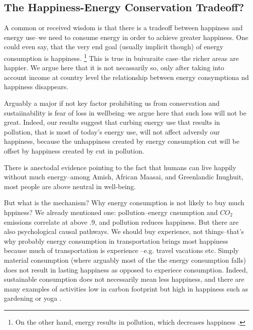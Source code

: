 \documentclass[10pt, letterpaper]{article}
\begin{document}
\begin{spacing}{1.4}
\section{The Happiness-Energy Conservation Tradeoff?}

A common or received wisdom is that there is a tradeoff between happiness and
energy use--we need to consume energy in order to achieve greater
happiness. One could even say, that the very end goal (usually implicit though)
of energy consumption is happiness. \footnote{On the other hand, energy results in pollution, which
  decreases happiness \citep[e.g]{welsch05, weinhold12}.} This is
true in buivaraite case--the richer areas are happier.
 We argue here that it is not necassarily so, only after taking into account
 income at country level %
 the relationship between energy consymptiona nd happiness disappears.


Arguably a major if not key factor prohibiting us from conservation and
sustaiinability is fear of loss in wellbeing--we argue here that such loss will
not be great. Indeed, our results suggest that curbing energy use that results
in pollution, that is most of today's energy use, will not affect adversly our
happiness, because the unhappiness created by energy consumption cut will be
offset by happiness created by cut in pollution.  

There is anectodal evidence pointing to the fact that humans can live happily
without much energy--among Amish, African Maasai, and Greenlandic Inughuit, most
people are above neutral in well-being.

But what is the mechanism? Why energy consumption is not likely to buy much
hppiness? We already mentioned one: pollution--energy cnsumption and $CO_2$
emissions correlate at above .9, and pollution reduces happiness. But there are
also psychological causal pathways.
We should buy experience, not things--that's why probably energy
consumption in transportation brings most happiness because much of
transportation is experience --e.g. travel vacations etc. 
Simply material consumption (where
arguably most of the  the energy consumption falls) does not result in lasting
happiness as opposed to experiece consumption. Indeed, sustainable consumption
does not necessarily mean less happiness, and there are many examples of
activities low in carbon footprint but high in happiness such as gardening or
yoga \citep{madjar06}. 



\end{spacing}
\end{document}
